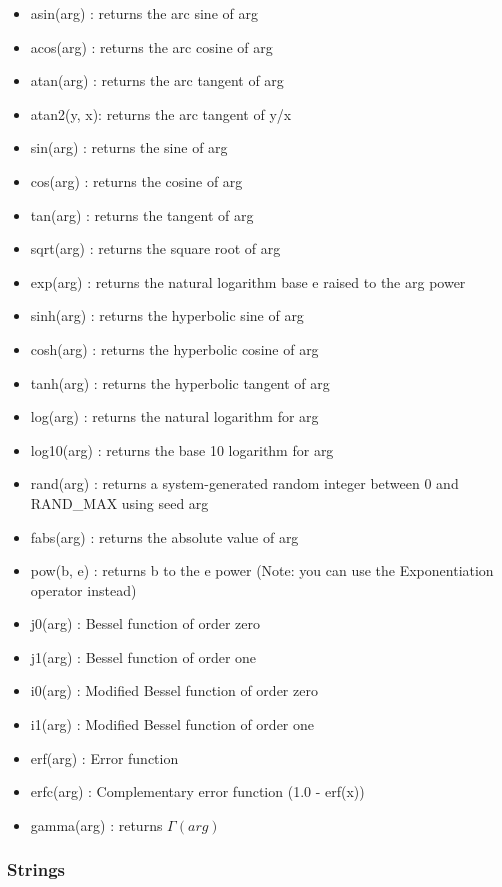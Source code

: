 \begin{itemize}
  \item asin(arg)  : returns the arc sine of arg
  \item acos(arg)  : returns the arc cosine of arg
  \item atan(arg)  : returns the arc tangent of arg
  \item atan2(y, x): returns the arc tangent of y/x
  \item sin(arg)   : returns the sine of arg
  \item cos(arg)   : returns the cosine of arg
  \item tan(arg)   : returns the tangent of arg
  \item sqrt(arg)  : returns the square root of arg
  \item exp(arg)   : returns the natural logarithm base e raised to the arg
                     power
  \item sinh(arg)  : returns the hyperbolic sine of arg
  \item cosh(arg)  : returns the hyperbolic cosine of arg
  \item tanh(arg)  : returns the hyperbolic tangent of arg
  \item log(arg)   : returns the natural logarithm for arg
  \item log10(arg) : returns the base 10 logarithm for arg
  \item rand(arg)  : returns a system-generated random integer between 0 and RAND\_MAX using seed arg
  \item fabs(arg)  : returns the absolute value of arg
  \item pow(b, e)  : returns b to the e power
                     (Note: you can use the Exponentiation operator instead)
  \item j0(arg)    : Bessel function of order zero
  \item j1(arg)    : Bessel function of order one
  \item i0(arg)    : Modified Bessel function of order zero
  \item i1(arg)    : Modified Bessel function of order one
  \item erf(arg)   : Error function
  \item erfc(arg)  : Complementary error function  (1.0 - erf(x))
  \item gamma(arg)  : returns $\Gamma(arg)$
\end{itemize}

\subsubsection{Strings}

